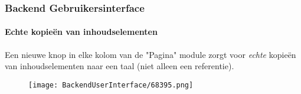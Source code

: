\begin{frame}[fragile]
	\frametitle{Backend Gebruikersinterface}
	\framesubtitle{Echte kopieën van inhoudselementen}

	Een nieuwe knop in elke kolom van de "Pagina" module zorgt voor \textit{echte} kopieën van inhoudselementen
	naar een taal (niet alleen een referentie).

	\begin{figure}
		\texttt{[image: BackendUserInterface/68395.png]}
	\end{figure}

\end{frame}


